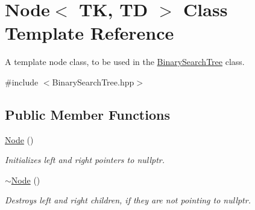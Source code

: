 \hypertarget{classNode}{}\section{Node$<$ TK, TD $>$ Class Template Reference}
\label{classNode}


A template node class, to be used in the \hyperlink{classBinarySearchTree}{Binary\+Search\+Tree} class.  




{\ttfamily \#include $<$Binary\+Search\+Tree.\+hpp$>$}

\subsection*{Public Member Functions}
\begin{DoxyCompactItemize}
\item 
\hyperlink{classNode_a78d65e1d59a007c5968389d36ff011a7}{Node} ()
\begin{DoxyCompactList}\small\item\em Initializes left and right pointers to nullptr. \end{DoxyCompactList}\item 
\hyperlink{classNode_a3730bdc7cc0efc1cce2f59f6d095315a}{$\sim$\+Node} ()
\begin{DoxyCompactList}\small\item\em Destroys left and right children, if they are not pointing to nullptr. \end{DoxyCompactList}\end{DoxyCompactItemize}

